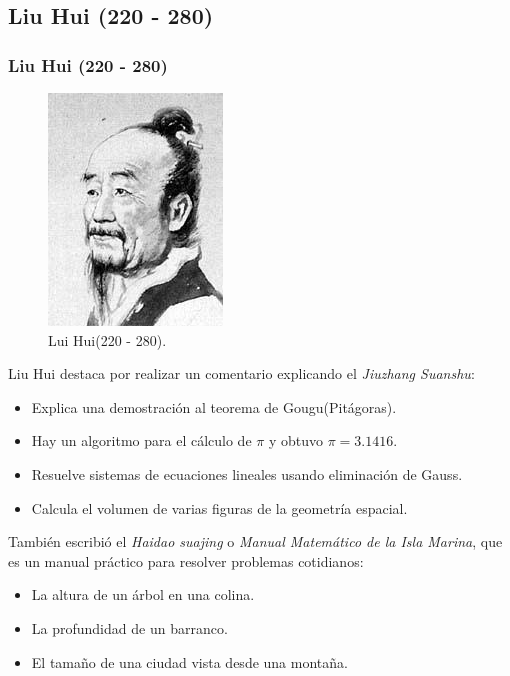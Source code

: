 \documentclass[compress, aspectratio=169]{beamer} %
\begin{document}
	\subsection{Liu Hui (220 - 280)}
		\begin{frame}
			\frametitle{Liu Hui (220 - 280)}
			\begin{figure}
				\centering
				\includegraphics[width = .25\linewidth]{liu_hui.jpg}
				\caption{Lui Hui(220 - 280).}
			\end{figure}
		\end{frame}
		
		\begin{frame}
			Liu Hui destaca por realizar un comentario explicando el \textit{Jiuzhang Suanshu}:

			\begin{itemize}
				\item Explica una demostración al teorema de Gougu(Pitágoras).
				\item Hay un algoritmo para el cálculo de $\pi$ y obtuvo $\pi = 3.1416$.
				\item Resuelve sistemas de ecuaciones lineales usando eliminación de Gauss.
				\item Calcula el volumen de varias figuras de la geometría espacial.
			\end{itemize}
	
			\pause

			También escribió el \textit{Haidao suajing} o \textit{Manual Matemático de la Isla Marina}, que es un manual
			práctico para resolver problemas cotidianos:
			
			\begin{itemize}
				\item La altura de un árbol en una colina.
				\item La profundidad de un barranco.
				\item El tamaño de una ciudad vista desde una montaña.
			\end{itemize}	
		\end{frame}
\end{document}
